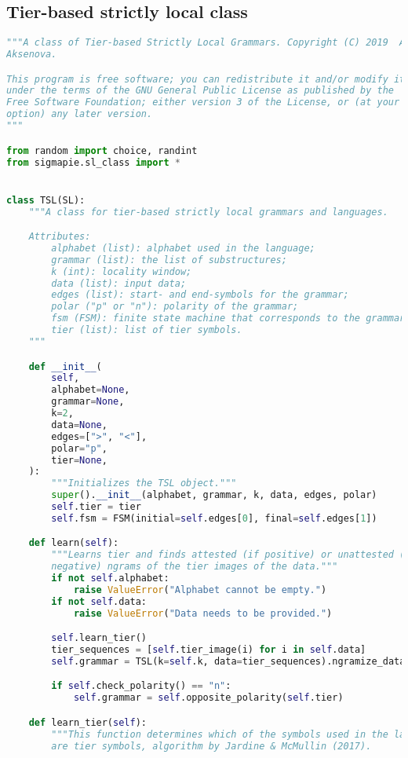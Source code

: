 \subsection*{Tier-based strictly local class}

\begin{lstlisting}[language=Python]
"""A class of Tier-based Strictly Local Grammars. Copyright (C) 2019  Alena
Aksenova.

This program is free software; you can redistribute it and/or modify it
under the terms of the GNU General Public License as published by the
Free Software Foundation; either version 3 of the License, or (at your
option) any later version.
"""

from random import choice, randint
from sigmapie.sl_class import *


class TSL(SL):
    """A class for tier-based strictly local grammars and languages.

    Attributes:
        alphabet (list): alphabet used in the language;
        grammar (list): the list of substructures;
        k (int): locality window;
        data (list): input data;
        edges (list): start- and end-symbols for the grammar;
        polar ("p" or "n"): polarity of the grammar;
        fsm (FSM): finite state machine that corresponds to the grammar;
        tier (list): list of tier symbols.
    """

    def __init__(
        self,
        alphabet=None,
        grammar=None,
        k=2,
        data=None,
        edges=[">", "<"],
        polar="p",
        tier=None,
    ):
        """Initializes the TSL object."""
        super().__init__(alphabet, grammar, k, data, edges, polar)
        self.tier = tier
        self.fsm = FSM(initial=self.edges[0], final=self.edges[1])

    def learn(self):
        """Learns tier and finds attested (if positive) or unattested (if
        negative) ngrams of the tier images of the data."""
        if not self.alphabet:
            raise ValueError("Alphabet cannot be empty.")
        if not self.data:
            raise ValueError("Data needs to be provided.")

        self.learn_tier()
        tier_sequences = [self.tier_image(i) for i in self.data]
        self.grammar = TSL(k=self.k, data=tier_sequences).ngramize_data()

        if self.check_polarity() == "n":
            self.grammar = self.opposite_polarity(self.tier)

    def learn_tier(self):
        """This function determines which of the symbols used in the language
        are tier symbols, algorithm by Jardine & McMullin (2017).


\end{lstlisting}
